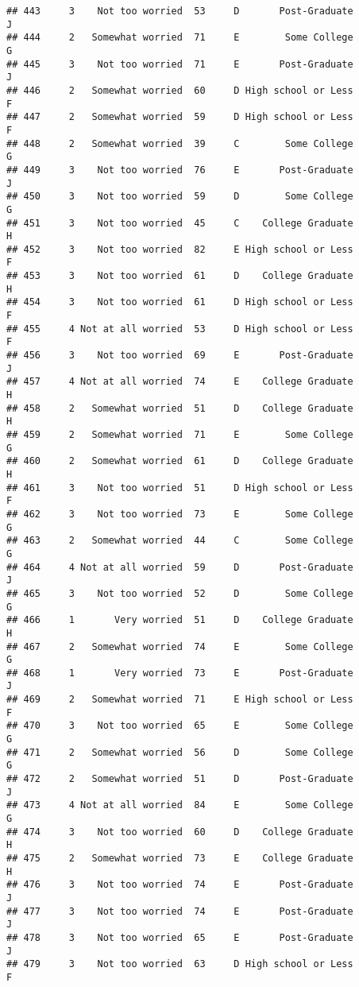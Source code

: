 \documentclass[
]{article}
\begin{document}
\begin{verbatim}
## 443     3    Not too worried  53     D       Post-Graduate         J
## 444     2   Somewhat worried  71     E        Some College         G
## 445     3    Not too worried  71     E       Post-Graduate         J
## 446     2   Somewhat worried  60     D High school or Less         F
## 447     2   Somewhat worried  59     D High school or Less         F
## 448     2   Somewhat worried  39     C        Some College         G
## 449     3    Not too worried  76     E       Post-Graduate         J
## 450     3    Not too worried  59     D        Some College         G
## 451     3    Not too worried  45     C    College Graduate         H
## 452     3    Not too worried  82     E High school or Less         F
## 453     3    Not too worried  61     D    College Graduate         H
## 454     3    Not too worried  61     D High school or Less         F
## 455     4 Not at all worried  53     D High school or Less         F
## 456     3    Not too worried  69     E       Post-Graduate         J
## 457     4 Not at all worried  74     E    College Graduate         H
## 458     2   Somewhat worried  51     D    College Graduate         H
## 459     2   Somewhat worried  71     E        Some College         G
## 460     2   Somewhat worried  61     D    College Graduate         H
## 461     3    Not too worried  51     D High school or Less         F
## 462     3    Not too worried  73     E        Some College         G
## 463     2   Somewhat worried  44     C        Some College         G
## 464     4 Not at all worried  59     D       Post-Graduate         J
## 465     3    Not too worried  52     D        Some College         G
## 466     1       Very worried  51     D    College Graduate         H
## 467     2   Somewhat worried  74     E        Some College         G
## 468     1       Very worried  73     E       Post-Graduate         J
## 469     2   Somewhat worried  71     E High school or Less         F
## 470     3    Not too worried  65     E        Some College         G
## 471     2   Somewhat worried  56     D        Some College         G
## 472     2   Somewhat worried  51     D       Post-Graduate         J
## 473     4 Not at all worried  84     E        Some College         G
## 474     3    Not too worried  60     D    College Graduate         H
## 475     2   Somewhat worried  73     E    College Graduate         H
## 476     3    Not too worried  74     E       Post-Graduate         J
## 477     3    Not too worried  74     E       Post-Graduate         J
## 478     3    Not too worried  65     E       Post-Graduate         J
## 479     3    Not too worried  63     D High school or Less         F

\end{verbatim}
\end{document}
